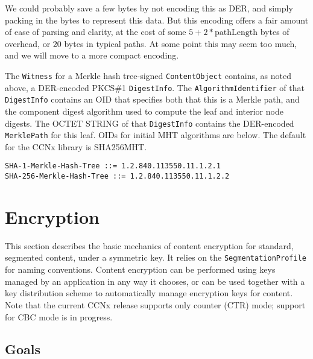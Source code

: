 We could probably save a few bytes by not encoding this as DER, and
simply packing in the bytes to represent this data. But this encoding
offers a fair amount of ease of parsing and clarity, at the cost of
some $5 + 2*\mbox{pathLength}$ bytes of overhead, or $20$ bytes in
typical paths. At some point this may seem too much, and we will move
to a more compact encoding.

The {\tt Witness} for a Merkle hash tree-signed {\tt ContentObject}
contains, as noted above, a DER-encoded PKCS\#1 {\tt DigestInfo}. The
{\tt AlgorithmIdentifier} of that {\tt DigestInfo} contains an OID
that specifies both that this is a Merkle path, and the component
digest algorithm used to compute the leaf and interior node
digests. The OCTET STRING of that {\tt DigestInfo} contains the
DER-encoded {\tt MerklePath} for this leaf. OIDs for initial MHT
algorithms are below. The default for the CCNx library is SHA256MHT.

\begin{verbatim}
SHA-1-Merkle-Hash-Tree ::= 1.2.840.113550.11.1.2.1  
SHA-256-Merkle-Hash-Tree ::= 1.2.840.113550.11.1.2.2
\end{verbatim}

\newpage


\section{Encryption}
\label{sec:BasicEncryption}

This section describes the basic mechanics of content encryption for
standard, segmented content, under a symmetric key. It relies on the
{\tt SegmentationProfile} for naming conventions.  Content encryption
can be performed using keys managed by an application in any way it
chooses, or can be used together with a key distribution scheme to
automatically manage encryption keys for content. Note that the current
CCNx release supports only counter (CTR) mode; support for CBC mode
is in progress.

\subsection{Goals}

